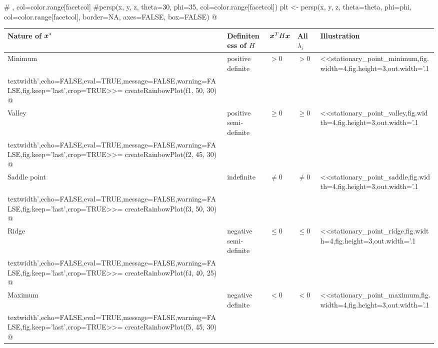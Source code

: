 \documentclass[%
  final,
  11pt, 
  show notes, %
  t, %
  fleqn, %
]{beamer}
\begin{document}
\begin{frame}[fragile]
{  # , col=color.range[facetcol]
  #persp(x, y, z, theta=30, phi=35, col=color.range[facetcol]) 
  plt <- persp(x, y, z, theta=theta, phi=phi, col=color.range[facetcol], border=NA, axes=FALSE, box=FALSE)
}
@
\vspace*{0.2cm}
\begin{tabular}{llllm{}}
\textbf{Nature of $\bm{x}^\ast$} & \textbf{Definiteness of $H$} & $\bm{x}^T H \bm{x}$ & All $\lambda_i$ & \textbf{Illustration} \\
\midrule
Minimum & positive definite & $> 0$ & $> 0$ &%
<<stationary_point_minimum,fig.width=4,fig.height=3,out.width='.1\\textwidth',echo=FALSE,eval=TRUE,message=FALSE,warning=FALSE,fig.keep='last',crop=TRUE>>=
createRainbowPlot(f1, 50, 30)
@%
 \\
Valley & positive semi-definite & $\geq 0$ & $\geq 0$ &%
<<stationary_point_valley,fig.width=4,fig.height=3,out.width='.1\\textwidth',echo=FALSE,eval=TRUE,message=FALSE,warning=FALSE,fig.keep='last',crop=TRUE>>=
createRainbowPlot(f2, 45, 30)
@%
 \\
Saddle point & indefinite & $\neq 0$ & $\neq 0$ &%
<<stationary_point_saddle,fig.width=4,fig.height=3,out.width='.1\\textwidth',echo=FALSE,eval=TRUE,message=FALSE,warning=FALSE,fig.keep='last',crop=TRUE>>=
createRainbowPlot(f3, 50, 30)
@%
 \\
Ridge & negative semi-definite & $\leq 0$ & $\leq 0$ &%
<<stationary_point_ridge,fig.width=4,fig.height=3,out.width='.1\\textwidth',echo=FALSE,eval=TRUE,message=FALSE,warning=FALSE,fig.keep='last',crop=TRUE>>=
createRainbowPlot(f4, 40, 25)
@
 \\
Maximum & negative definite & $< 0$ & $< 0$ &%
<<stationary_point_maximum,fig.width=4,fig.height=3,out.width='.1\\textwidth',echo=FALSE,eval=TRUE,message=FALSE,warning=FALSE,fig.keep='last',crop=TRUE>>=
createRainbowPlot(f5, 45, 30)
@%
 \\
\end{tabular}
\end{frame}
\end{document}
